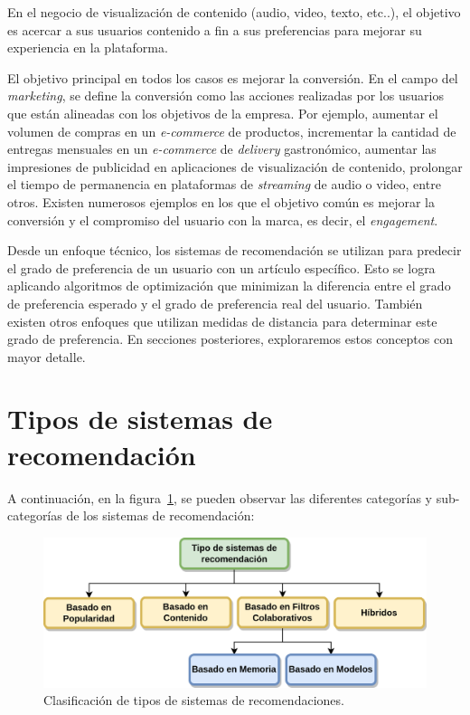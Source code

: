 \documentclass[11pt,a4paper,twoside]{thesis}
\begin{document}
En el negocio de visualización de contenido (audio, video, texto, etc..), el
objetivo es acercar a sus usuarios contenido a fin a sus preferencias para
mejorar su experiencia en la plataforma.

El objetivo principal en todos los casos es mejorar la conversión. En el campo
del \textit{marketing}, se define la conversión como las acciones realizadas
por los usuarios que están alineadas con los objetivos de la empresa. Por
ejemplo, aumentar el volumen de compras en un \textit{e-commerce} de productos,
incrementar la cantidad de entregas mensuales en un \textit{e-commerce} de
\textit{delivery} gastronómico, aumentar las impresiones de publicidad en
aplicaciones de visualización de contenido, prolongar el tiempo de permanencia
en plataformas de \textit{streaming} de audio o video, entre otros. Existen
numerosos ejemplos en los que el objetivo común es mejorar la conversión y el
compromiso del usuario con la marca, es decir, el \textit{engagement}.

Desde un enfoque técnico, los sistemas de recomendación se utilizan para
predecir el grado de preferencia de un usuario con un artículo específico. Esto
se logra aplicando algoritmos de optimización que minimizan la diferencia entre
el grado de preferencia esperado y el grado de preferencia real del usuario.
También existen otros enfoques que utilizan medidas de distancia para
determinar este grado de preferencia. En secciones posteriores, exploraremos
estos conceptos con mayor detalle.

\clearpage
\section{Tipos de sistemas de recomendación}

A continuación, en la figura~\ref{fig:clasification}, se pueden observar las
diferentes categorías y sub-categorías de los sistemas de recomendación:

\begin{figure}[!htb]
	\centering
	\includegraphics[width=12cm]{./images/clasificacion-sis-rec.png}
	\caption{Clasificación de tipos de sistemas de recomendaciones.}
	\label{fig:clasification}
\end{figure}
\end{document}
